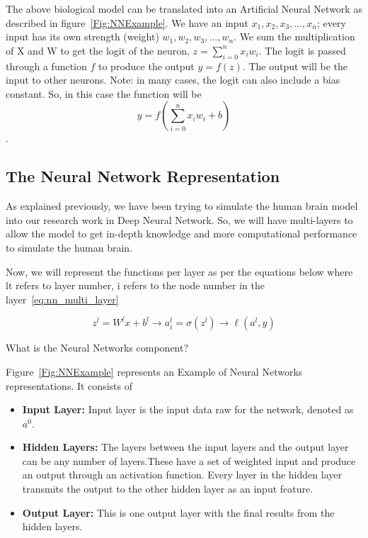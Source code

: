The above biological model can be translated into an Artificial Neural Network as described in figure~\ref{Fig:NNExample}. We have an input $x_1,x_2,x_3,...,x_n$; every input has its own strength (weight) $w_1,w_2,w_3,...,w_n$. We sum the multiplication of X and W to get the logit of the neuron, $z =  \sum_{i=0}^{n} x_i w_i $. The logit is passed through a function $f$ to produce the output $ y = f(z)$. The output will be the input to other neurons. Note: in many cases, the logit can also include a bias constant. So, in this case the function will be $$ y = f(\sum_{i=0}^{n} x_i w_i + b)$$.
 
\subsection{The Neural Network Representation}
As explained previously, we have been trying to simulate the human brain model into our research work in Deep Neural Network. So, we will have multi-layers to allow the model to get in-depth knowledge and more computational performance to simulate the human brain. 

Now, we will represent the functions per layer as per the equations below where lt refers to layer number, i refers to the node number in the layer~\eqref{eq:nn_multi_layer}%

\begin{equation}\label{eq:nn_multi_layer}
\boxed{z^l = W^l x + b^l} \longrightarrow \boxed{a_i^l = \sigma(z^l)} \longrightarrow \boxed{\ell(a^l,y)}
\end{equation}

What is the Neural Networks component?

Figure~\ref{Fig:NNExample} represents an Example of Neural Networks representations. It consists of

\begin{itemize}
\item \textbf{Input Layer:} Input layer is the input data raw for the network, denoted as $a^0$.
\item \textbf{Hidden Layers:} The layers between the input layers and the output layer can be any number of layers.These have a set of weighted input and produce an output through an activation function. Every layer in the hidden layer transmits the output to the other hidden layer as an input feature.
\item \textbf{Output Layer:} This is one output layer with the final results from the hidden layers.
\end{itemize}

